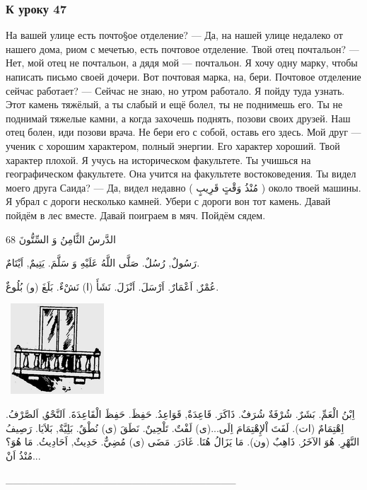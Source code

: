 \documentclass[a5paper]{article}
\begin{document}
\subsubsection{К уроку 47}
На вашей улице есть почто§ое отделение? — Да, на нашей улице недалеко от нашего дома, риом с мечетью, есть почтовое отделение. Твой отец почтальон? — Нет, мой отец не почтальон, а дядя мой — почтальон. Я хочу одну марку, чтобы написать письмо своей дочери. Вот почтовая марка, на, бери. Почтовое отделение сейчас работает? — Сейчас не знаю, но утром работало. Я пойду туда узнать. Этот камень тяжёлый, а ты слабый и ещё болел, ты не поднимешь его. Ты не поднимай тяжелые камни, а когда захочешь поднять, позови своих друзей. Наш отец болен, иди позови врача. Не бери его с собой, оставь его здесь. Мой друг — ученик с хорошим характером, полный энергии. Его характер хороший. Твой характер плохой. Я учусь на историческом факультете. Ты учишься на географическом факультете. Она учится на факультете востоковедения. Ты видел моего друга Саида? — Да, видел недавно ( مُنْذُ وَقْتٍ قَرِيبٍ ) около твоей машины. Я убрал с дороги несколько камней. Убери с дороги вон тот камень. Давай пойдём в лес вместе. Давай поиграем в мяч. Пойдём сядем.

الدَّرسُ الثَّامِنُ وَ السِّتُّونَ 68

رَسُولٌ, رُسُلٌ. صَلَّى اللَّهُ عَلَيْهِ وَ سَلَّمَ. يَتِيمٌ, اَيْتَامٌ. 

عُمْرٌ, اَعْمَارٌ. اَرْسَلَ. اَنْزَلَ. نَشَأَ (ا) نَشْءٌ. بَلَغَ (و) بُلُوغٌ. 

\  \includegraphics[width=1.3783in,height=1.3335in]{images/MuhammadBagauddinprettified-img218.png} 

اِبْنُ الْعَمِّ. بَشَرٌ. شُرْفَةٌ شُرَفٌ. ذَاكَرَ. قَاعِدَةٌ, قَوَاعِدُ. حَفِظَ. حَفِظَ الْقَاعِدَةَ. اَلنَّحْوُ.ِ اَلصَّرْفُ. اِهْتِمَامٌ (ات). لَفَتَ اْلإِهْتِمَامَ اِلَى...(ى) لَفْتٌ. تَلْحِينٌ. نَطَقَ (ى) نُطْقٌ. بَلِيَّةٌ, بَلاَيَا. رَصِيفُ النَّهْرِ. هُوَ الآخَرُ. ذَاهِبٌ (ون). مَا يَزَالُ هُنَا. غَادَرَ. مَضَى (ى) مُضِيٌّ. حَدِيثٌ, اَحَادِيثُ. مَا هُوَ؟ مُنْذُ اَنْ...

\_\_\_\_\_\_\_\_\_\_\_\_\_\_\_\_\_\_\_\_\_\_\_\_\_\_\_\_\_\_\_ 
\end{document}
